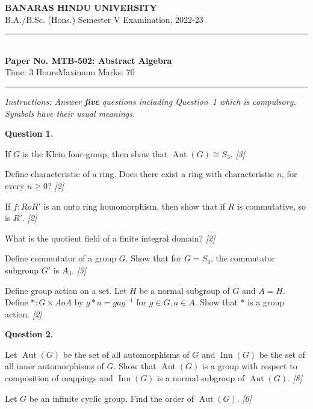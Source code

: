 \documentclass[11pt,a4paper]{article}
\newcommand{\pts}[1]{\hfill   \textit{[#1]}}
\begin{document}
\begin{center}
  {\large\bfseries BANARAS HINDU UNIVERSITY}\\[2pt]
  {\normalsize B.A./B.Sc. (Hons.) Semester V Examination, 2022-23}\\[6pt]
  \rule{0.8\linewidth}{0.5pt}\\[6pt]
  {\large\bfseries Paper No. MTB-502: Abstract Algebra}\\[4pt]
  {\normalsize Time: 3 Hours\hfill Maximum Marks: 70}
\end{center}

\rule{\linewidth}{0.4pt}

\smallskip



\noindent   \textit{Instructions: Answer   \textbf{five} questions including Question~1 which is compulsory. Symbols have their usual meanings.}

\bigskip
\medskip


\noindent   \textbf{Question 1.}

\begin{parts}
  \item If $G$ is the Klein four-group, then show that $\operatorname{Aut}(G) \cong S_3$. \pts{3}
  \item Define characteristic of a ring. Does there exist a ring with characteristic $n$, for every $n \ge 0$? \pts{2}
  \item If $f : R  o R'$ is an onto ring homomorphism, then show that if $R$ is commutative, so is $R'$. \pts{2}
  \item What is the quotient field of a finite integral domain? \pts{2}
  \item Define commutator of a group $G$. Show that for $G = S_3$, the commutator subgroup $G'$ is $A_3$. \pts{3}
  \item Define group action on a set. Let $H$ be a normal subgroup of $G$ and $A = H$. Define $*: G  \times A  o A$ by $g * a = gag^{-1}$ for $g \in G, a \in A$. Show that $*$ is a group action. \pts{2}
\end{parts}

\medskip


\noindent   \textbf{Question 2.}

\begin{parts}
  \item Let $\operatorname{Aut}(G)$ be the set of all automorphisms of $G$ and $\operatorname{Inn}(G)$ be the set of all inner automorphisms of $G$. Show that $\operatorname{Aut}(G)$ is a group with respect to composition of mappings and $\operatorname{Inn}(G)$ is a normal subgroup of $\operatorname{Aut}(G)$. \pts{8}
  \item Let $G$ be an infinite cyclic group. Find the order of $\operatorname{Aut}(G)$. \pts{6}
\end{parts}
\end{document}
